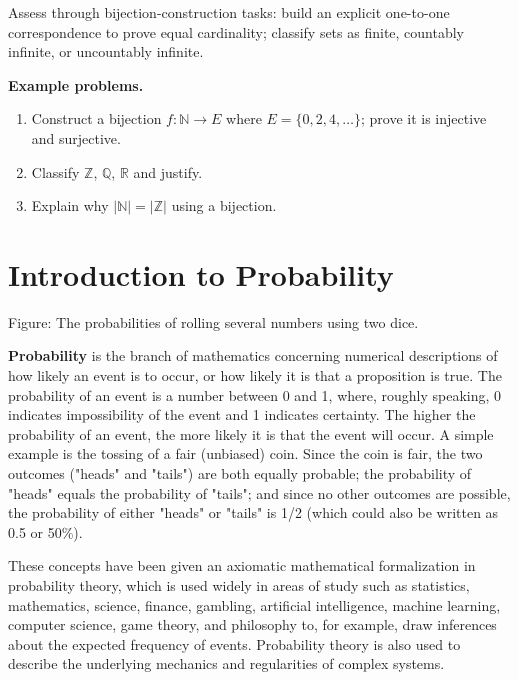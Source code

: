 Assess through bijection-construction tasks: build an explicit one-to-one
correspondence to prove equal cardinality; classify sets as finite,
countably infinite, or uncountably infinite.

\textbf{Example problems.}
\begin{enumerate}
    \item Construct a bijection $f:\mathbb{N}\to E$ where
          $E=\{0,2,4,\ldots\}$; prove it is injective and surjective.
    \item Classify $\mathbb{Z}$, $\mathbb{Q}$, $\mathbb{R}$ and justify.
    \item Explain why $|\mathbb{N}|=|\mathbb{Z}|$ using a bijection.
\end{enumerate}



\section{Introduction to Probability}
\label{sec:intr-ce2f}





Figure: The probabilities of rolling several numbers using two dice.



\textbf{Probability} is the branch of mathematics concerning numerical descriptions of how likely an event is to occur, or how likely it is that a proposition is true. The probability of an event is a number between 0 and 1, where, roughly speaking, 0 indicates impossibility of the event and 1 indicates certainty. The higher the probability of an event, the more likely it is that the event will occur. A simple example is the tossing of a fair (unbiased) coin. Since the coin is fair, the two outcomes ("heads" and "tails") are both equally probable; the probability of "heads" equals the probability of "tails"; and since no other outcomes are possible, the probability of either "heads" or "tails" is 1/2 (which could also be written as 0.5 or 50\%).



These concepts have been given an axiomatic mathematical formalization in probability
theory, which is used widely in areas of study such as statistics, mathematics, science,
finance, gambling, artificial intelligence, machine learning, computer science, game
theory, and philosophy to, for example, draw inferences about the expected frequency of
events. Probability theory is also used to describe the underlying mechanics and
regularities of complex systems.




